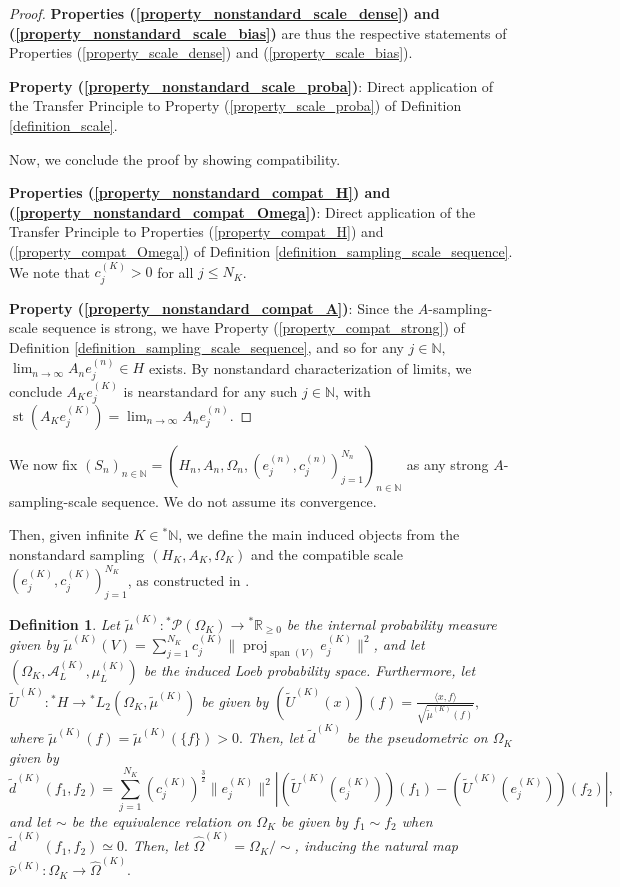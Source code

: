 \documentclass[10pt,a4paper]{amsart}
\newtheorem{defn}[thm]{Definition}
\def \Proj{\operatorname{proj}}
\def \Span{\operatorname{span}}
\def \St{\operatorname{st}}
\def \HOM{\hat{\Omega}}
\def \HNU{\hat{\nu}}
\def \LL{\langle}
\def \RR{\rangle}
\begin{document}
\begin{proof}
	\textbf{Properties (\ref{property_nonstandard_scale_dense}) and (\ref{property_nonstandard_scale_bias})} are thus the respective statements of Properties (\ref{property_scale_dense}) and (\ref{property_scale_bias}).
	
	\textbf{Property (\ref{property_nonstandard_scale_proba})}: Direct application of the Transfer Principle to Property (\ref{property_scale_proba}) of Definition \ref{definition_scale}.
	
	Now, we conclude the proof by showing compatibility.
	
	\textbf{Properties (\ref{property_nonstandard_compat_H}) and (\ref{property_nonstandard_compat_Omega})}: Direct application of the Transfer Principle to Properties (\ref{property_compat_H}) and (\ref{property_compat_Omega}) of Definition \ref{definition_sampling_scale_sequence}. We note that $c_j^{(K)}>0$ for all $j\leq N_K$.
	
	\textbf{Property (\ref{property_nonstandard_compat_A})}: Since the $A$-sampling-scale sequence is strong, we have Property (\ref{property_compat_strong}) of Definition \ref{definition_sampling_scale_sequence}, and so for any $j\in\mathbb{N},$ $\lim_{n\rightarrow\infty}A_n e_j^{(n)}\in H$ exists. By nonstandard characterization of limits, we conclude $A_Ke_j^{(K)}$ is nearstandard for any such $j\in\mathbb{N}$, with $\St\left(A_K e_j^{(K)}\right)=\lim_{n\rightarrow\infty}A_n e_j^{(n)} $.
\end{proof}

We now fix $(S_n)_{n\in\mathbb{N}}=(H_n,A_n,\Omega_n, (e_j^{(n)},c_j^{(n)})_{j=1}^{N_n})_{n\in\mathbb{N}}$ as any strong $A$-sampling-scale sequence. We do not assume its convergence. 

Then, given infinite $K\in{}^*\mathbb{N}$, we define the main induced objects from the nonstandard sampling $(H_K,A_K,\Omega_K)$ and the compatible scale $(e_j^{(K)}, c_j^{(K)})_{j=1}^{N_K}$, as constructed in \cite{nonez2024spectralequivalencesnonstandardsamplings}.

\begin{defn}\label{definition_nonstandard_internal_measure}
	Let $\tilde{\mu}^{(K)}:{}^*\mathcal{P}(\Omega_K)\rightarrow{}^*\mathbb{R}_{\geq0}$ be the internal probability measure given by $\tilde{\mu}^{(K)}(V)=\sum_{j=1}^{N_K}c_j^{(K)}\|\Proj_{\Span(V)}e_j^{(K)}\|^2$, and let $(\Omega_K,\mathcal{A}_L^{(K)},\mu_L^{(K)})$ be the induced Loeb probability space. Furthermore, let $\tilde{U}^{(K)}:{}^*H\rightarrow {}^*L_2(\Omega_K,\tilde{\mu}^{(K)})$ be given by $\left(\tilde{U}^{(K)}(x)\right)(f)=\frac{\LL x, f\RR}{\sqrt{\tilde{\mu}^{(K)}(f)}},$ where $\tilde{\mu}^{(K)}(f)=\tilde{\mu}^{(K)}(\{f\})>0.$ Then, let $\tilde{d}^{(K)}$ be the pseudometric on $\Omega_K$ given by $$\tilde{d}^{(K)}(f_1, f_2)=\sum_{j=1}^{N_K}\left(c_j^{(K)}\right)^{\frac{3}{2}}\|e_j^{(K)}\|^2\left|\left(\tilde{U}^{(K)}(e_j^{(K)})\right)(f_1)-\left(\tilde{U}^{(K)}(e_j^{(K)})\right)(f_2)\right|,$$ and let $\sim$ be the equivalence relation on $\Omega_K$ be given by $f_1\sim f_2$ when $\tilde{d}^{(K)}(f_1,f_2)\simeq 0.$ Then, let $\HOM^{(K)}=\Omega_K/\sim$, inducing the natural map $\HNU^{(K)}:\Omega_K\rightarrow\HOM^{(K)}.$
\end{defn}
\end{document}
